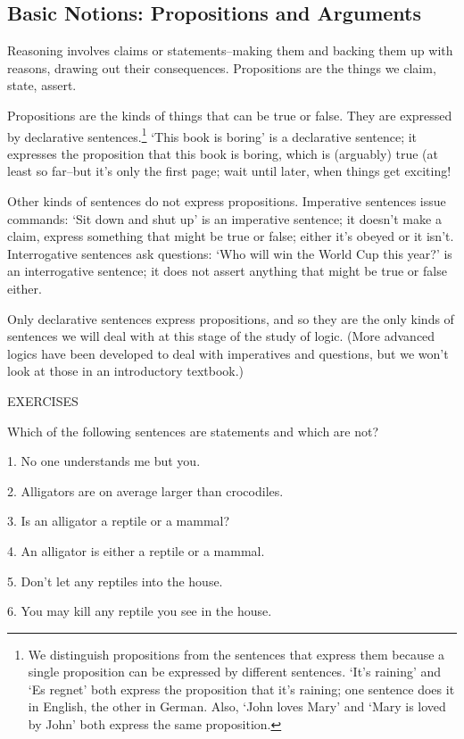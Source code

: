 \subsection{Basic Notions: Propositions and Arguments} 
Reasoning involves claims or 
statements--making them and backing them up with reasons, drawing out their consequences. 
Propositions are the things we claim, state, assert. 

Propositions are the kinds of things that can be 
true or false. They are expressed by declarative sentences.\footnote{We distinguish propositions from 
the sentences that express them because a single proposition can be expressed by different sentences. 
`It's raining' and `Es regnet' both express the proposition that it's raining; one sentence does it 
in English, the other in German. Also, `John loves Mary' and `Mary is loved by John' both express the 
same proposition.} `This book is boring' is a declarative sentence; it expresses the proposition that 
this book is boring, which is (arguably) true (at least so far--but it's only the first page; wait 
until later, when things get exciting! 

Other kinds of sentences do not express propositions. Imperative sentences issue 
commands: `Sit down and shut up' is an imperative sentence; it doesn't make a claim, express 
something that might be true or false; either it's obeyed or it isn't. Interrogative sentences ask 
questions: `Who will win the World Cup this year?' is an interrogative sentence; it does not assert 
anything that might be true or false either.

Only declarative sentences express propositions, and so they are the only kinds of sentences we
will deal with at this stage of the study of logic. (More advanced logics have been developed to
deal with imperatives and questions, but we won't look at those in an introductory textbook.)

EXERCISES

Which of the following sentences are statements and which are not?

1.  No one understands me but you.

2.  Alligators are on average larger than crocodiles.

3.  Is an alligator a reptile or a mammal?

4.  An alligator is either a reptile or a mammal.

5.  Don't let any reptiles into the house.

6.  You may kill any reptile you see in the house.

